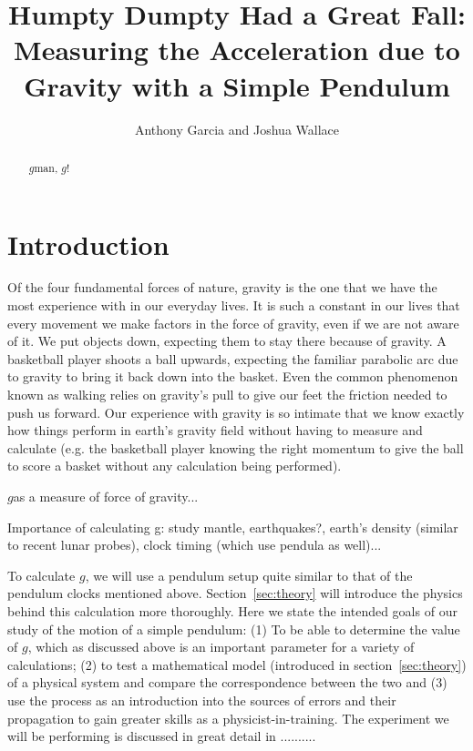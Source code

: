 \documentclass[iop]{emulateapj}
\def\g{$g$}
\begin{document}
\title{Humpty Dumpty Had a Great Fall: Measuring the Acceleration due to Gravity with a Simple Pendulum}

\author{ Anthony Garcia
and
Joshua Wallace}

\begin{abstract}

\g man, \g!

\end{abstract}

\section{Introduction}

Of the four fundamental forces of nature, gravity is the one that we have the 
most experience with in our everyday lives.  It is such a constant in our lives 
that every movement we make factors in the force of gravity, even if we are not
aware of it. We put objects down, expecting them to stay there because of 
gravity. A basketball player shoots a ball upwards, expecting the familiar 
parabolic arc due to gravity to bring it back down into the basket.  Even the
common phenomenon known as walking relies on gravity's pull to give our feet
the friction needed to push us forward. Our experience with gravity is so
intimate that we know exactly how things perform in earth's gravity field 
without having to measure and calculate (e.g. the basketball player knowing the 
right momentum to give the ball to score a basket without any calculation being
performed).

\g as a measure of force of gravity...

Importance of calculating g:  study mantle, earthquakes?, earth's density 
(similar to recent lunar probes), clock timing (which use pendula as well)...

To calculate \g, we will use a pendulum setup quite similar to that of the
pendulum clocks mentioned above.  Section~\ref{sec:theory} will introduce the 
physics behind this calculation more thoroughly.  Here we state the intended 
goals of our study of the motion of a simple pendulum:  (1) To be able to 
determine the value of \g, which as discussed above is an important parameter
for a variety of calculations; (2) to test a mathematical model (introduced in 
section~\ref{sec:theory}) of a physical system and compare the correspondence 
between the two and (3) use the process as an introduction into the sources of 
errors and their propagation to gain greater skills as a physicist-in-training. 
The experiment we will be performing is discussed in great detail in .......... 
\end{document}
